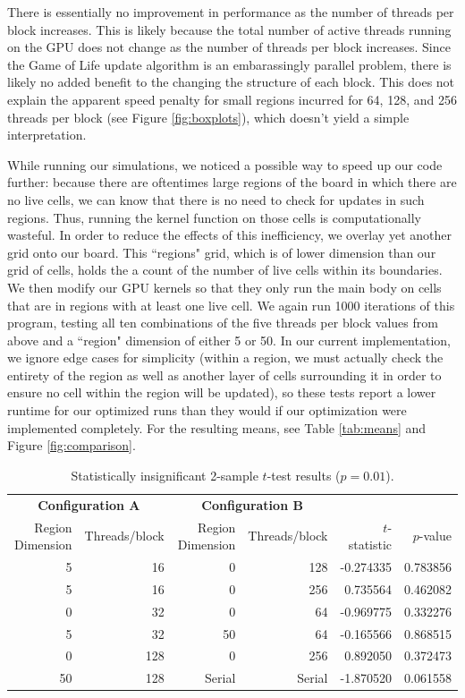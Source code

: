 \documentclass[onecolumn,12pt]{IEEEtran}
\begin{document}
  There is essentially no improvement in performance as the number of threads per
  block increases. This is likely because the total number of active threads
  running on the GPU does not change as the number of threads per block
  increases. Since the Game of Life update algorithm is an embarassingly parallel
  problem, there is likely no added benefit to the changing the structure of each
  block. This does not explain the apparent speed penalty for small regions
  incurred for 64, 128, and 256 threads per block (see Figure
  \ref{fig:boxplots}), which doesn't yield a simple interpretation.

  While running our simulations, we noticed a possible way to speed up our code
  further: because there are oftentimes large regions of the board in which there
  are no live cells, we can know that there is no need to check for updates in
  such regions. Thus, running the kernel function on those cells is
  computationally wasteful. In order to reduce the effects of this inefficiency,
  we overlay yet another grid onto our board. This ``regions" grid, which is of
  lower dimension than our grid of cells, holds the a count of the number of live
  cells within its boundaries. We then modify our GPU kernels so that they only
  run the main body on cells that are in regions with at least one live cell. We
  again run 1000 iterations of this program, testing all ten combinations of the
  five threads per block values from above and a ``region" dimension of either 5
  or 50. In our current implementation, we ignore edge cases for simplicity
  (within a region, we must actually check the entirety of the region as well as
  another layer of cells surrounding it in order to ensure no cell within the
  region will be updated), so these tests report a lower runtime for our
  optimized runs than they would if our optimization were implemented completely.
  For the resulting means, see Table \ref{tab:means} and Figure \ref{fig:comparison}.
  \begin{table}
    \centering
    \caption{Statistically insignificant 2-sample $t$-test results ($p = 0.01$).}
    \begin{tabular}{rrrrrr} \toprule
      \multicolumn{2}{c}{\textbf{Configuration A}} &
      \multicolumn{2}{c}{\textbf{Configuration B}}
      \\
      Region Dimension & Threads/block &  Region Dimension & Threads/block &
      $t$-statistic & $p$-value \\ \midrule
      5  & 16  &      0 &   128  & -0.274335 & 0.783856 \\
      5  & 16  &      0 &   256  &  0.735564 & 0.462082 \\
      0  & 32  &      0 &    64  & -0.969775 & 0.332276 \\
      5  & 32  &     50 &    64  & -0.165566 & 0.868515 \\
      0  & 128 &      0 &   256  &  0.892050 & 0.372473 \\
      50 & 128 & Serial & Serial & -1.870520 & 0.061558 \\ \bottomrule
    \end{tabular}
    \label{tab:stats}
  \end{table}

  
\end{document}
